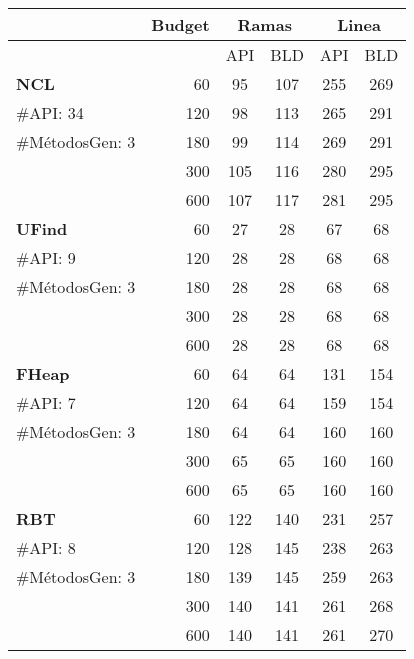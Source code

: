 \begin{table}[H]
\centering

{\scriptsize

\begin{tabular}{l |r |cc |cc }
\hline
&Budget&\multicolumn{2}{c|}{Ramas} &\multicolumn{2}{c|}{Linea} \\
\hline
   &   &API &BLD  &API &BLD   \\
\hline

\multirow{1}{*}{\textbf{NCL}}
& 60 & 95 & 107  & 255& 269  \\
{\scriptsize \#API: 34}& 120 & 98 & 113 & 265 &291 \\
{\scriptsize \#MétodosGen: 3}& 180 & 99& 114 & 269 & 291  \\
& 300 & 105 & 116  &280 & 295   \\
& 600 & 107 &  117 & 281&  295\\
\hline

\multirow{1}{*}{\textbf{UFind}} 
& 60 & 27 & 28  & 67& 68 \\
  {\scriptsize \#API: 9}& 120 & 28 & 28 & 68 &68 \\
  {\scriptsize \#MétodosGen: 3}& 180 & 28& 28 & 68 &68  \\
  & 300 & 28 & 28 &68 & 68  \\
& 600 & 28 &  28 & 68& 68 \\
\hline

\multirow{1}{*}{\textbf{FHeap}} 
 & 60  & 64 & 64&131 & 154  \\
  {\scriptsize \#API: 7}& 120 & 64 &64 & 159 & 154  \\
  {\scriptsize \#MétodosGen: 3}& 180 & 64 & 64  & 160 & 160 \\
  & 300 &  65& 65 & 160& 160  \\
& 600 & 65 & 65  &160 & 160 \\
 \hline

\multirow{1}{*}{\textbf{RBT}} 
 & 60 & 122 & 140  & 231 & 257 \\
  {\scriptsize \#API: 8}& 120 & 128 & 145  & 238 & 263 \\
  {\scriptsize \#MétodosGen: 3}& 180 & 139 & 145  & 259 & 263  \\
  & 300 & 140 & 141 &261 &   268\\
& 600 & 140 &  141 & 261& 270 \\
 \hline


\end{tabular}}
\end{table}
